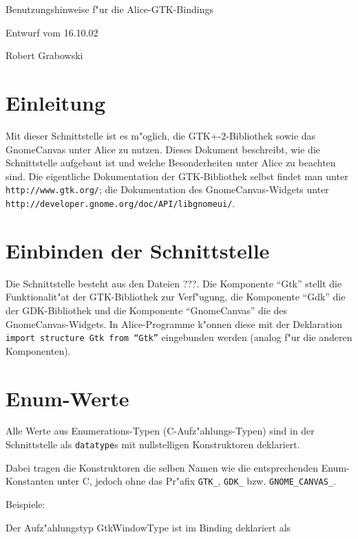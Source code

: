\documentclass{article}
\begin{document}
\begin{center}
\begin{huge}Benutzungshinweise f"ur die Alice-GTK-Bindings\end{huge}

Entwurf vom 16.10.02

Robert Grabowski

\end{center}



\section{Einleitung}
Mit dieser Schnittstelle ist es m"oglich, die GTK+-2-Bibliothek sowie das
GnomeCanvas unter Alice zu nutzen. Dieses Dokument beschreibt, wie die
Schnittstelle aufgebaut ist und welche Besonderheiten unter Alice zu beachten
sind. Die eigentliche Dokumentation der GTK-Bibliothek selbst findet man unter
\texttt{http://www.gtk.org/}; die Dokumentation des GnomeCanvas-Widgets unter
\texttt{http://developer.gnome.org/doc/API/libgnomeui/}.



\section{Einbinden der Schnittstelle}
Die Schnittstelle besteht aus den Dateien ???. Die Komponente ``Gtk'' stellt
die Funktionalit"at der GTK-Bibliothek zur Verf"ugung, die Komponente ``Gdk''
die der GDK-Bibliothek und die Komponente ``GnomeCanvas'' die des 
GnomeCanvas-Widgets. In Alice-Programme k"onnen diese mit der Deklaration
\texttt{import structure Gtk from ``Gtk''} eingebunden werden (analog f"ur
die anderen Komponenten).



\section{Enum-Werte}

Alle Werte aus Enumerations-Typen (C-Aufz"ahlungs-Typen) sind in der
Schnittstelle als \texttt{datatype}s mit nullstelligen Konstruktoren
deklariert.

Dabei tragen die Konstruktoren die selben Namen wie die entsprechenden
Enum-Konstanten unter C, jedoch ohne das Pr"afix \texttt{GTK\_},
\texttt{GDK\_} bzw. \texttt{GNOME\_CANVAS\_}. 

Beispiele:

Der Aufz"ahlungstyp GtkWindowType ist im Binding deklariert als
\end{document}
